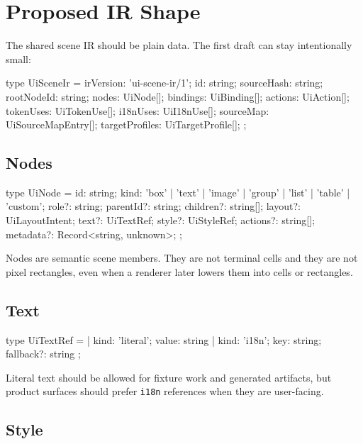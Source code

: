 \section{Proposed IR Shape}\label{record-138-proposed-ir-shape}

The shared scene IR should be plain data. The first draft can stay intentionally small:

\begin{CodeBlock}
type UiSceneIr = {
  irVersion: 'ui-scene-ir/1';
  id: string;
  sourceHash: string;
  rootNodeId: string;
  nodes: UiNode[];
  bindings: UiBinding[];
  actions: UiAction[];
  tokenUses: UiTokenUse[];
  i18nUses: UiI18nUse[];
  sourceMap: UiSourceMapEntry[];
  targetProfiles: UiTargetProfile[];
};
\end{CodeBlock}

\subsection{Nodes}\label{record-138-nodes}

\begin{CodeBlock}
type UiNode = {
  id: string;
  kind: 'box' | 'text' | 'image' | 'group' | 'list' | 'table' | 'custom';
  role?: string;
  parentId?: string;
  children?: string[];
  layout?: UiLayoutIntent;
  text?: UiTextRef;
  style?: UiStyleRef;
  actions?: string[];
  metadata?: Record<string, unknown>;
};
\end{CodeBlock}

Nodes are semantic scene members. They are not terminal cells and they are not pixel rectangles, even when a renderer later lowers them into cells or rectangles.

\subsection{Text}\label{record-138-text}

\begin{CodeBlock}
type UiTextRef =
  | { kind: 'literal'; value: string }
  | { kind: 'i18n'; key: string; fallback?: string };
\end{CodeBlock}

Literal text should be allowed for fixture work and generated artifacts, but product surfaces should prefer \texttt{i\allowbreak{}1\allowbreak{}8\allowbreak{}n} references when they are user-facing.

\subsection{Style}\label{record-138-style}

